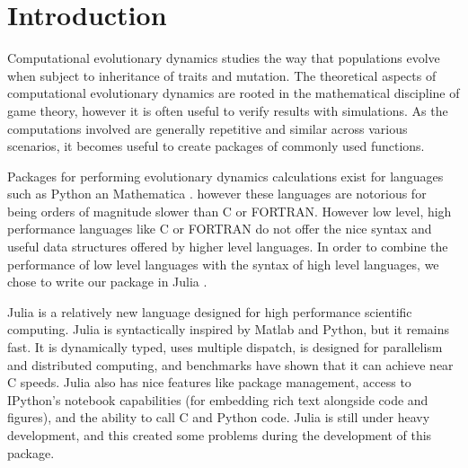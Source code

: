 \section{Introduction}

Computational evolutionary dynamics studies the way that populations evolve when subject to inheritance of traits and mutation.
The theoretical aspects of computational evolutionary dynamics are rooted in the mathematical discipline of game theory, however it is often useful to verify results with simulations.
As the computations involved are generally repetitive and similar across various scenarios, it becomes useful to create packages of commonly used functions.

Packages for performing evolutionary dynamics calculations exist for languages such as Python \cite{pyevodyn} an Mathematica \cite{dynamo}. however these languages are notorious for being orders of magnitude slower than C or FORTRAN.
However low level, high performance languages like C or FORTRAN do not offer the nice syntax and useful data structures offered by higher level languages.
In order to combine the performance of low level languages with the syntax of high level languages, we chose to write our package in Julia \cite{julia}.

Julia is a relatively new language designed for high performance scientific computing.
Julia is syntactically inspired by Matlab and Python, but it remains fast.
It is dynamically typed, uses multiple dispatch, is designed for parallelism and distributed computing, and benchmarks have shown that it can achieve near C speeds.
Julia also has nice features like package management, access to IPython's notebook capabilities (for embedding rich text alongside code and figures), and the ability to call C and Python code.
Julia is still under heavy development, and this created some problems during the development of this package.
